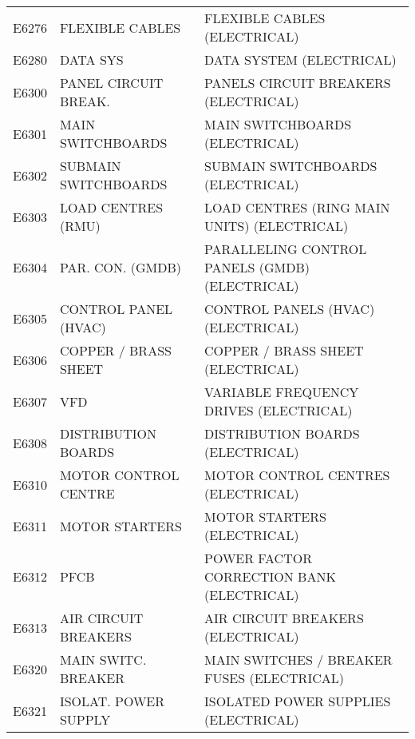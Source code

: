 \begin{longtable}[l]{l%
                  l|%
                  l|}
\rowcolor{thetableheadbgcolor!0.25!white} E6276       & FLEXIBLE CABLES   & FLEXIBLE CABLES (ELECTRICAL)   \\
\rowcolor{thetableheadbgcolor!0.25!white} E6280       & DATA SYS   & DATA SYSTEM (ELECTRICAL)   \\
\rowcolor{thetableheadbgcolor!0.25!white} E6300       & PANEL CIRCUIT BREAK.   & PANELS CIRCUIT BREAKERS (ELECTRICAL)   \\
\rowcolor{thetableheadbgcolor!0.25!white} E6301       & MAIN SWITCHBOARDS   & MAIN SWITCHBOARDS (ELECTRICAL)   \\
\rowcolor{thetableheadbgcolor!0.25!white} E6302       & SUBMAIN SWITCHBOARDS   & SUBMAIN SWITCHBOARDS (ELECTRICAL)   \\
\rowcolor{thetableheadbgcolor!0.25!white} E6303       & LOAD CENTRES (RMU)   & LOAD CENTRES (RING MAIN UNITS) (ELECTRICAL)   \\
\rowcolor{thetableheadbgcolor!0.25!white} E6304       & PAR. CON. (GMDB)   & PARALLELING CONTROL PANELS (GMDB) (ELECTRICAL)   \\
\rowcolor{thetableheadbgcolor!0.25!white} E6305       & CONTROL PANEL (HVAC)   & CONTROL PANELS (HVAC) (ELECTRICAL)   \\
\rowcolor{thetableheadbgcolor!0.25!white} E6306       & COPPER / BRASS SHEET   & COPPER / BRASS SHEET (ELECTRICAL)   \\
\rowcolor{thetableheadbgcolor!0.25!white} E6307       & VFD   & VARIABLE FREQUENCY DRIVES (ELECTRICAL)   \\
\rowcolor{thetableheadbgcolor!0.25!white} E6308       & DISTRIBUTION BOARDS   & DISTRIBUTION BOARDS (ELECTRICAL)   \\
\rowcolor{thetableheadbgcolor!0.25!white} E6310       & MOTOR CONTROL CENTRE   & MOTOR CONTROL CENTRES (ELECTRICAL)   \\
\rowcolor{thetableheadbgcolor!0.25!white} E6311       & MOTOR STARTERS   & MOTOR STARTERS (ELECTRICAL)   \\
\rowcolor{thetableheadbgcolor!0.25!white} E6312       & PFCB   & POWER FACTOR CORRECTION BANK (ELECTRICAL)   \\
\rowcolor{thetableheadbgcolor!0.25!white} E6313       & AIR CIRCUIT BREAKERS   & AIR CIRCUIT BREAKERS (ELECTRICAL)   \\
\rowcolor{thetableheadbgcolor!0.25!white} E6320       & MAIN SWITC.  BREAKER   & MAIN SWITCHES / BREAKER FUSES (ELECTRICAL)   \\
\rowcolor{thetableheadbgcolor!0.25!white} E6321       & ISOLAT. POWER SUPPLY   & ISOLATED POWER SUPPLIES (ELECTRICAL)   \\

\end{longtable}
